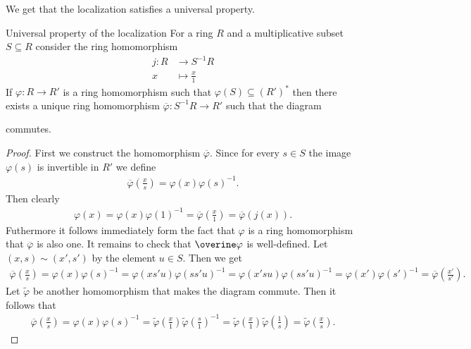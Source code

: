 \documentclass[../notes.tex]{subfiles}
\begin{document}
\smallskip
\noindent
We get that the localization satisfies a universal property.

\smallskip
\begin{lemm}{Universal property of the localization}{}
  For a ring $R$ and a multiplicative subset $S \subseteq R$ consider the ring homomorphism
  \begin{align*}
    j: R & \longrightarrow S^{-1}R \\
    x & \longmapsto \frac{x}{1}
  \end{align*}
  If $\varphi : R \to R'$ is a ring homomorphism such that $\varphi(S) \subseteq (R')^*$
  then there exists a unique ring homomorphism $\overline{\varphi}: S^{-1}R \to R'$
  such that the diagram
  \begin{center}
  \end{center}
  commutes.
\end{lemm}

\begin{proof}
  First we construct the homomorphism $\overline{\varphi}$. Since for every
  $s \in S$ the image $\varphi(s)$ is invertible in $R'$ we define
  \begin{align*}
    \overline{\varphi} \left(\frac{x}{s} \right) = \varphi(x) \varphi(s)^{-1}.
  \end{align*}
  Then clearly
  \begin{align*}
    \varphi(x) = \varphi(x) \varphi(1)^{-1} = \overline{\varphi} \left(\frac{x}{1} \right)
    = \overline{\varphi}(j(x)).
  \end{align*}
  Futhermore it follows immediately form the fact that $\varphi$ is a ring homomorphism
  that $\overline\varphi$ is also one. It remains to check that $\overine\varphi$ is
  well-defined. Let $(x,s) \sim (x',s')$ by the element $u \in S$. Then we get
  \begin{align*}
    \overline{\varphi} \left(\frac{x}{s} \right) = \varphi(x) \varphi(s)^{-1}
    = \varphi(xs'u) \varphi(ss'u)^{-1} = \varphi(x'su) \varphi(ss'u)^{-1} = \varphi(x')
    \varphi(s')^{-1} = \overline{\varphi} \left(\frac{x'}{s'} \right).
  \end{align*}
  Let $\tilde\varphi$ be another homomorphism that makes the diagram commute.
  Then it follows that
  \begin{align*}
    \overline{\varphi} \left(\frac{x}{s} \right) = \varphi(x) \varphi(s)^{-1}
    = \tilde{\varphi} \left(\frac{x}{1} \right) \tilde{\varphi} \left(\frac{s}{1} \right)^{-1}
    = \tilde{\varphi} \left(\frac{x}{1} \right) \tilde{\varphi} \left(\frac{1}{s} \right)
    = \tilde{\varphi} \left(\frac{x}{s} \right).
  \end{align*}
\end{proof}
\end{document}
